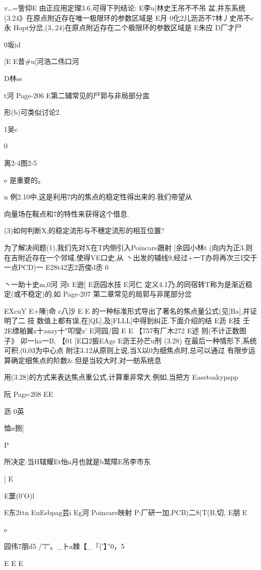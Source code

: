 {{{{{{{{{{{{v…=訾仰E
由正应用定理3.6,可得下列结论:
E李u[林史王吊不不吊
盆,并东系统(3.24》在原点附近存在唯一极限环的参数区域是
E月
0化2儿沥沥不7林丿史吊不c永
Hopt分岔,(3,.24)在原点附近存在二个极限环的参数区域是
E朱应
D厂才尸

0坂id

[E
E昔#u[河浩二伟口河

D林ss

t河
Page-206
E第二辅常见的尸郭与非局部分盅

形(b)可类似讨论2.

1吴c

0

离2-4图2-5

e
是重要的。

n
例2.10中,这是利用7内的焦点的稳定性得出来的.我们帝望从

向量场在鞍点和7的特性来获得这个借息.

(3)如何判断X,的稳定流形与不穗定流形的相互位置?

为了解决间题(1),我们先对X在T内侧引入Poincare跚射
[余园小林t
(向内为正3.则在吉附近存在一个邻域,使得VE口史,从
丶出发的辅线9,经过+一T办将再次三I交于一点PCD)一
E28t42志2沥俊d丞
0

丶一助十史m,0河
河t
E逊[
E沥园水技
E河仁
定义4.1乃,的同宿转T称为是渐近稳定(或不稳定)的,如
Page-207
第二章常见的局郭与非尾部分岔

EXcuY
E+陲)命
c八沙
E
E
的一种标准形式导出了著名的焦点量公式(见[Ba],并证明了二
技
数值上都有误,在[QL],及[FLLL]中得到纠正.下面介绍的结
E沥
E技
壬2E缥舶翼z十anzy十″叩燮z'
E河园/园
E
E
【757有厂木272
E述
则(不计正数图子》
卯一ha一B,
【01
[E口2振EAgs
E沥王孙芒u刑
(3.28)
在最后一种情形下,系统可积,(0,03为中心点
附注3.12从原则上说,当X以0为细焦点时,总可以通过
有限步运算确定细焦点的阶数&.但是当较大时,对一舫系统息

用(3.28)的方式来表达焦点重公式,计算重非常大.例如,当把方
Easetoakypspp

阮
Page-208
EE

沥
0英

恤n捌[

P

所决定:当H辖耀Et怡a月也就是b鹫障E吊李市东

[
E

E噩(0'O)l

E东2ttn
EuEsbpag芸i
Eg河
Poincare映射
P:厂研一加,PCB)二8(T(B,切,
E朋
E

e

园伟7朋d5
/′7″。_卜a棘【_『(′】”0，5

E
E
E

}}}}}}}}}}}}

